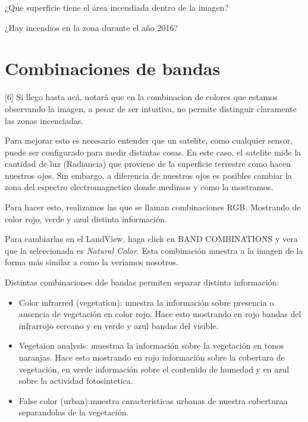 \documentclass[a4paper,10pt]{article}
\begin{document}
\begin{figure}[h!]
    \centering
    \caption{}
    \label{fig:slider}
\end{figure}

\begin{que}
    ¿Que superficie tiene el área incendiada dentro de la imagen?
\end{que}

\begin{que}
    ¿Hay incendios en la zona durante el año 2016?
\end{que}

\section{Combinaciones de bandas} [6]
Si llego hasta acá, notará que en la combinacion de colores que estamos observando la imagen, a pesar de ser intuitiva, no permite distinguir claramente las zonas incenciadas.

Para mejorar esto es necesario entender que un satelite, como cualquier sensor, puede ser configurado para medir distintas cosas. En este caso, el satelite mide la cantidad de luz (Radiancia) que proviene de la superficie terrestre como hacen nuestros ojos. Sin embargo, a diferencia de nuestros ojos es posibles cambiar la zona del espectro electromagnetico donde medimos y como la mostramos.

Para hacer esto, realizamos las que se llaman combinaciones RGB. Mostrando de color rojo, verde y azul distinta información.

Para cambiarlas en el LandView, haga click en BAND COMBINATIONS y vera que la seleccionada es \emph{Natural Color}. Esta combinación muestra a la imagen de la forma más similar a como la veriamos nosotros.

Distintas combinaciones dde bandas permiten separar distinta información:

\begin{itemize}
    \item Color infrarred (vegetation): muestra la información sobre presencia o ausencia de vegetación en color rojo. Hace esto mostrando en rojo bandas del infrarrojo cercano y en verde y azul bandas del visible.
    \item Vegetaion analysis: muestraa la información sobre la vegetación en tonos naranjas. Hace esto mostrando en rojo información sobre la cobertura de vegetación, en verde información sobre el contenido de humedad y en azul sobre la actividad fotosintetica.
    \item False color (urban):muestra caracteristicas urbanas de nuestra coberturaa separandolas de la vegetación.
\end{itemize}
\end{document}
